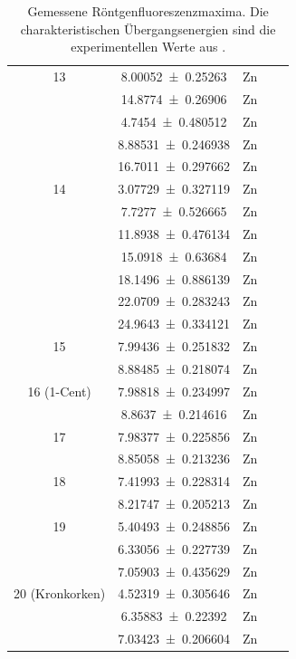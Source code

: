 \documentclass[
	a4paper,
	12pt,
	pagesize,
	ngerman
]{scrartcl}
\begin{document}
\begin{table}[H]
\begin{tabular}{ c | c || c | c | c }
			13 & \SI{8.00052+-0.25263}{} &Zn &  \SI{}{} \\
			& \SI{14.8774+-0.26906}{} &Zn &  \SI{}{} \\
			& \SI{4.7454+-0.480512}{} &Zn &  \SI{}{} \\
			& \SI{8.88531+-0.246938}{} &Zn &  \SI{}{} \\
			& \SI{16.7011+-0.297662}{} &Zn &  \SI{}{} \\ \hline
			
			14 & \SI{3.07729+-0.327119}{} &Zn &  \SI{}{} \\
			& \SI{7.7277+-0.526665}{} &Zn &  \SI{}{} \\
			& \SI{11.8938+-0.476134}{} &Zn &  \SI{}{} \\
			& \SI{15.0918+-0.63684}{} &Zn &  \SI{}{} \\
			& \SI{18.1496+-0.886139}{} &Zn &  \SI{}{} \\
			& \SI{22.0709+-0.283243}{} &Zn &  \SI{}{} \\
			& \SI{24.9643+-0.334121}{} &Zn &  \SI{}{} \\ \hline
			
			15 & \SI{7.99436+-0.251832}{} &Zn &  \SI{}{} \\
			& \SI{8.88485+-0.218074}{} &Zn &  \SI{}{} \\ \hline
			
			16 (1-Cent)& \SI{7.98818+-0.234997}{} &Zn &  \SI{}{} \\
			& \SI{8.8637+-0.214616}{} &Zn &  \SI{}{} \\ \hline
			
			17 & \SI{7.98377+-0.225856}{} &Zn &  \SI{}{} \\
			& \SI{8.85058+-0.213236}{} &Zn &  \SI{}{} \\ \hline
			
			18 & \SI{7.41993+-0.228314}{} &Zn &  \SI{}{} \\
			& \SI{8.21747+-0.205213}{} &Zn &  \SI{}{} \\ \hline
			
			19 & \SI{5.40493+-0.248856}{} &Zn &  \SI{}{} \\
			& \SI{6.33056+-0.227739}{} &Zn &  \SI{}{} \\
			& \SI{7.05903+-0.435629}{} &Zn &  \SI{}{} \\ \hline
			
			20 (Kronkorken) & \SI{4.52319+-0.305646}{} &Zn &  \SI{}{} \\
			& \SI{6.35883+-0.22392}{} &Zn &  \SI{}{} \\
			& \SI{7.03423+-0.206604}{} &Zn &  \SI{}{} \\ \hline
		\end{tabular}
		\caption{Gemessene Röntgenfluoreszenzmaxima. Die charakteristischen Übergangsenergien sind die experimentellen Werte aus \cite{XRAYDB}.}
		\label{tb_peaks_unknown} 
	\end{table}
	
\end{document}
